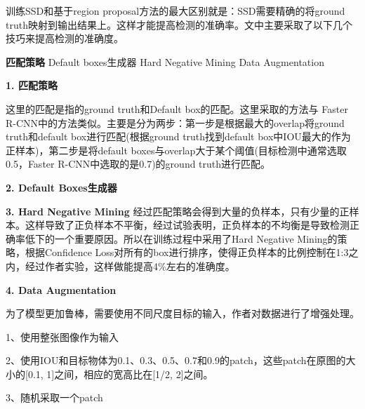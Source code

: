 训练SSD和基于region proposal方法的最大区别就是：SSD需要精确的将ground truth映射到输出结果上。这样才能提高检测的准确率。文中主要采取了以下几个技巧来提高检测的准确度。

\textbf{匹配策略}
Default boxes生成器
Hard Negative Mining
Data Augmentation

\textbf{1. 匹配策略}

这里的匹配是指的ground truth和Default box的匹配。这里采取的方法与 Faster R-CNN中的方法类似。主要是分为两步：第一步是根据最大的overlap将ground truth和default box进行匹配(根据ground truth找到default box中IOU最大的作为正样本)，第二步是将default boxes与overlap大于某个阈值(目标检测中通常选取0.5，Faster R-CNN中选取的是0.7)的ground truth进行匹配。

\textbf{2. Default Boxes生成器}

\textbf{3. Hard Negative Mining}
经过匹配策略会得到大量的负样本，只有少量的正样本。这样导致了正负样本不平衡，经过试验表明，正负样本的不均衡是导致检测正确率低下的一个重要原因。所以在训练过程中采用了Hard Negative Mining的策略，根据Confidence Loss对所有的box进行排序，使得正负样本的比例控制在1:3之内，经过作者实验，这样做能提高4\%左右的准确度。

\textbf{4. Data Augmentation}

为了模型更加鲁棒，需要使用不同尺度目标的输入，作者对数据进行了增强处理。

1、使用整张图像作为输入

2、使用IOU和目标物体为0.1、0.3、0.5、0.7和0.9的patch，这些patch在原图的大小的[0.1, 1]之间，相应的宽高比在[1/2, 2]之间。

3、随机采取一个patch

